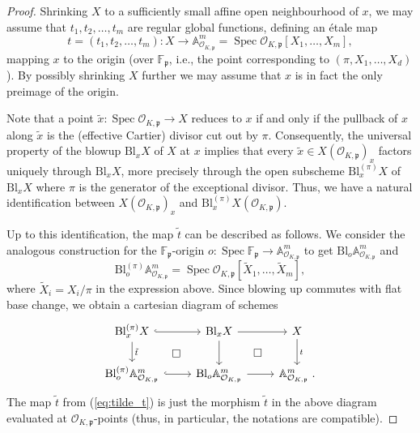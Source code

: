 \documentclass[11pt,oneside]{amsart}
\theoremstyle{plain}
\theoremstyle{definition}
\DeclareMathOperator{\spec}{Spec} \DeclareMathOperator{\sgn}{sign}
\def\F{\mathbb{F}}
\def\oh{\mathcal{O}}
\begin{document}
\begin{proof}
Shrinking $X$ to a sufficiently small affine open neighbourhood of $x$, we may assume that $t_1, t_2, \dots, t_m$ are regular global functions, defining an \'{e}tale map $$t=(t_1, t_2, \dots, t_m): X \rightarrow \mathbb{A}^m_{\oh_{K, \mathfrak{p}}}=\spec\oh_{K, \mathfrak{p}}[X_1, \dots, X_m],$$ mapping $x$ to the origin (over $\F_{\mathfrak{p}}$, i.e., the point corresponding to $(\pi, X_1, \dots, X_d)$). By possibly shrinking $X$ further we may assume that $x$ is in fact the only preimage of the origin. %

Note that a point $\tilde{x}: \spec{\oh_{K, \mathfrak{p}}}\rightarrow X$ reduces to $x$ if and only if the pullback of $x$ along $\tilde{x}$ is the (effective Cartier) divisor cut out by $\pi$. Consequently, the universal property of the blowup $\mathrm{Bl}_x X$ of $X$ at $x$ implies that every $\tilde{x} \in X(\oh_{K,\mathfrak{p}})_x$ factors uniquely through $\mathrm{Bl}_x X$, more precisely through the open subscheme $\mathrm{Bl}_x^{(\pi)} X$ of $\mathrm{Bl}_x X$ where $\pi$ is the generator of the exceptional divisor. %
Thus, we have a natural identification between $X(\oh_{K,\mathfrak{p}})_x$ and $\mathrm{Bl}_x^{(\pi)} X(\oh_{K, \mathfrak{p}})$. 

Up to this identification, the map $\tilde{t}$ can be described as follows. We consider the analogous construction for the $\F_{\mathfrak{p}}$-origin $o:\spec\F_{\mathfrak{p}}\rightarrow \mathbb{A}^m_{\oh_{K, \mathfrak{p}}}$ to get $\mathrm{Bl}_o \mathbb{A}^m_{\oh_{K, \mathfrak{p}}}$ and 
$$\mathrm{Bl}_o^{(\pi)} \mathbb{A}^m_{\oh_{K, \mathfrak{p}}}=\spec\oh_{K, \mathfrak{p}}[\tilde{X}_1, \dots, \tilde{X}_m],$$ where $\tilde{X}_i=X_i/\pi$ in the expression above. Since blowing up commutes with flat base change, we obtain a cartesian diagram of schemes
\begin{equation}\label{blowup}
\begin{tikzcd}
 \mathrm{Bl}_x^{(\pi)} X \arrow[hook]{r} \ar[d, "\tilde{t}"]\ar[dr, phantom, "\square"] & \mathrm{Bl}_x X  \ar[r] \arrow{d} \ar[dr, phantom, "\square"]
  & X \ar[d, "t"] \\
\mathrm{Bl}_o^{(\pi)} \mathbb{A}^m_{\oh_{K, \mathfrak{p}}}   \arrow[hook]{r}
  & \mathrm{Bl}_o \mathbb{A}^m_{\oh_{K, \mathfrak{p}}} \ar[r]
  & \mathbb{A}^m_{\oh_{K, \mathfrak{p}}}\;.
\end{tikzcd}  
\end{equation}
The map $\tilde{t}$ from (\ref{eq:tilde_t}) is just the morphism $\tilde{t}$ in the above diagram evaluated at $\oh_{K, \mathfrak{p}}$-points (thus, in particular, the notations are compatible).


\end{proof}
\end{document}
